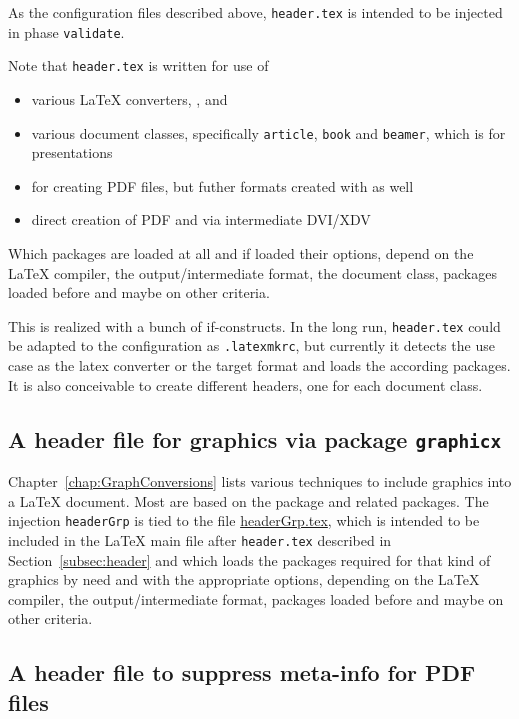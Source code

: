 As the configuration files described above, 
\texttt{header.tex} is intended to be injected in phase \texttt{validate}. 

Note that \texttt{header.tex} is written for use of 
%
\begin{itemize}
  \item various \LaTeX{} converters, \lualatex, \xelatex{} and \pdflatex{} 
  \item various document classes, specifically \texttt{article}, \texttt{book} 
  and \texttt{beamer}, which is for presentations 
  \item for creating PDF files, but futher formats created with  as well
  \item direct creation of PDF and via intermediate DVI/XDV 
\end{itemize}

Which packages are loaded at all and if loaded their options, 
depend on the \LaTeX{} compiler, the output/intermediate format, 
the document class, packages loaded before and maybe on other criteria. 

This is realized with a bunch of if-constructs. 
In the long run, \texttt{header.tex} could be adapted 
to the configuration as \texttt{.latexmkrc}, 
but currently it detects the use case 
as the latex converter or the target format 
and loads the according packages. 
It is also conceivable to create different headers, one for each document class. 


\subsection{A header file for graphics via package \texttt{graphicx} }%
\label{subsec:headerGrp}

Chapter~\ref{chap:GraphConversions} lists various techniques 
to include graphics into a \LaTeX{} document. 
Most are based on the package  and related packages. 
The injection \texttt{headerGrp} 
is tied to the file \href{\urlSite fromTex/headerGrp.tex}{headerGrp.tex}, 
which is intended to be included in the \LaTeX{} main file 
after \texttt{header.tex} described in Section~\ref{subsec:header} 
and which loads the packages required for that kind of graphics 
by need and with the appropriate options, 
depending on the \LaTeX{} compiler, the output/intermediate format, 
packages loaded before and maybe on other criteria. 


\subsection{A header file to suppress meta-info for PDF files }\label{subsec:headerSuppressMetaPDF}

